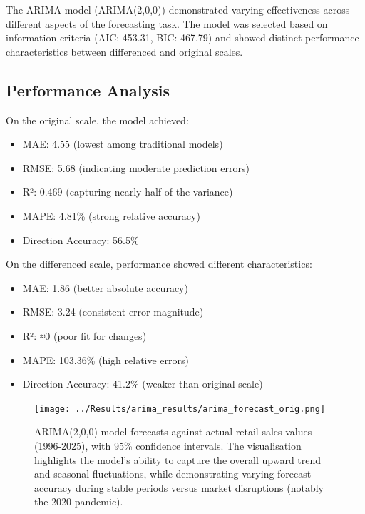 \documentclass[12pt,a4paper]{report}
\begin{document}
The ARIMA model (ARIMA(2,0,0)) demonstrated varying effectiveness across different aspects of the forecasting task. The model was selected based on information criteria (AIC: 453.31, BIC: 467.79) and showed distinct performance characteristics between differenced and original scales.

\subsection{Performance Analysis}
On the original scale, the model achieved:
\begin{itemize}
    \item MAE: 4.55 (lowest among traditional models)
    \item RMSE: 5.68 (indicating moderate prediction errors)
    \item R²: 0.469 (capturing nearly half of the variance)
    \item MAPE: 4.81\% (strong relative accuracy)
    \item Direction Accuracy: 56.5\%
\end{itemize}

On the differenced scale, performance showed different characteristics:
\begin{itemize}
    \item MAE: 1.86 (better absolute accuracy)
    \item RMSE: 3.24 (consistent error magnitude)
    \item R²: ≈0 (poor fit for changes)
    \item MAPE: 103.36\% (high relative errors)
    \item Direction Accuracy: 41.2\% (weaker than original scale)
\end{itemize}

\begin{figure}[htbp]
\centering
\texttt{[image: ../Results/arima\_results/arima\_forecast\_orig.png]}
\caption{ARIMA(2,0,0) model forecasts against actual retail sales values (1996-2025), with 95\% confidence intervals. The visualisation highlights the model's ability to capture the overall upward trend and seasonal fluctuations, while demonstrating varying forecast accuracy during stable periods versus market disruptions (notably the 2020 pandemic).}
\label{fig:arima_forecast}
\end{figure}
\end{document}
